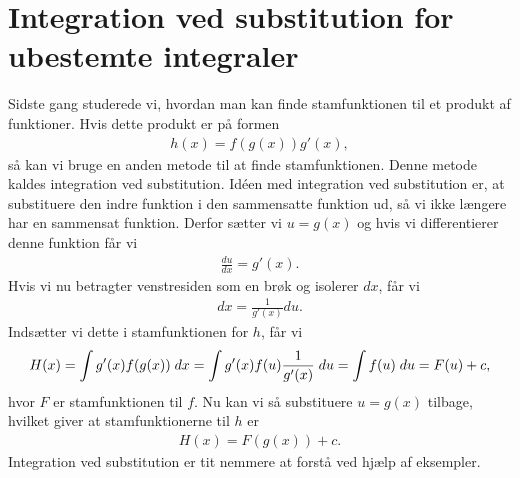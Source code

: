 \section{Integration ved substitution for ubestemte integraler}
\noindent Sidste gang studerede vi, hvordan man kan finde stamfunktionen til et produkt af funktioner. Hvis dette produkt er på formen 
\begin{align}\label{eq:ubestemtint3et}
h(x)=f(g(x))g'(x),
\end{align}
så kan vi bruge en anden metode til at finde stamfunktionen. Denne metode kaldes integration ved substitution. Idéen med integration ved substitution er, at substituere den indre funktion i den sammensatte funktion ud, så vi ikke længere har en sammensat funktion. Derfor sætter vi $u=g(x)$ og hvis vi differentierer denne funktion får vi 
\begin{align*}
\frac{du}{dx}=g'(x).
\end{align*}
Hvis vi nu betragter venstresiden som en brøk og isolerer $dx$, får vi
\begin{align*}
dx = \frac{1}{g'(x)}du.
\end{align*}
Indsætter vi dette i stamfunktionen for $h$, får vi
\begin{align*}
H(x) = \int g'(x)f(g(x)) \; d x = \int g'(x) f(u) \frac{1}{g'(x)} \; d u = \int f(u) \; d u = F(u) + c,
\end{align*}
hvor $F$ er stamfunktionen til $f$. Nu kan vi så substituere $u = g(x)$ tilbage, hvilket giver at stamfunktionerne til $h$ er 
\begin{align*}
H(x) = F(g(x)) + c.
\end{align*}
Integration ved substitution er tit nemmere at forstå ved hjælp af eksempler.

